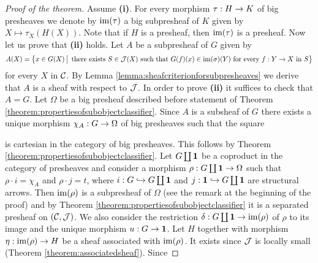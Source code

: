 \begin{proof}[Proof of the theorem]
Assume \textbf{(i)}. For every morphism $\tau:H\rightarrow K$ of big presheaves we denote by $\mathrm{im}(\tau)$ a big subpresheaf of $K$ given by $X\mapsto \tau_X\left(H(X)\right)$. Note that if $H$ is a presheaf, then $\mathrm{im}(\tau)$ is a presheaf. Now let us prove that \textbf{(ii)} holds. Let $A$ be a subpresheaf of $G$ given by
$$A(X) = \big\{x\in G(X)\,\big|\,\mbox{ there exists }S\in {\mathcal J}(X)\mbox{ such that }G(f)(x)\in \mathrm{im}(\sigma)(Y)\mbox{ for every }f:Y\rightarrow X\mbox{ in } S\big\}$$
for every $X$ in ${\mathcal C}$. By Lemma \ref{lemma:sheafcriterionforsubpresheaves} we derive that $A$ is a sheaf with respect to ${\mathcal J}$. In order to prove \textbf{(ii)} it suffices to check that $A = G$. Let $\Omega$ be a big presheaf described before statement of Theorem \ref{theorem:propertiesofsubobjectclassifier}. Since $A$ is a subsheaf of $G$ there exists a unique morphism $\chi_A:G\rightarrow \Omega$ of big presheaves such that the square
\begin{center}
\end{center}
is cartesian in the category of big presheaves. This follows by Theorem \ref{theorem:propertiesofsubobjectclassifier}. Let $G\coprod \mathbf{1}$ be a coproduct in the category of presheaves and consider a morphism $\rho:G\coprod \mathbf{1}\rightarrow \Omega$ such that $\rho\cdot i = \chi_A$ and $\rho\cdot j = t$, where $i:G\hookrightarrow G\coprod \mathbf{1}$ and $j:\mathbf{1}\hookrightarrow G\coprod \mathbf{1}$ are structural arrows. Then $\mathrm{im}(\rho)$ is a subpresheaf of $\Omega$ (see the remark at the beginning of the proof) and by Theorem \ref{theorem:propertiesofsubobjectclassifier} it is a separated presheaf on $({\mathcal C},{\mathcal J})$. We also consider the restriction $\delta:G\coprod \mathbf{1}\rightarrow \mathrm{im}(\rho)$ of $\rho$ to its image and the unique morphism $u:G\rightarrow \mathbf{1}$. Let $H$ together with morphism $\eta:\mathrm{im}(\rho)\rightarrow H$ be a sheaf associated with $\mathrm{im}(\rho)$. It exists since ${\mathcal J}$ is locally small (Theorem \ref{theorem:associatedsheaf}). Since

\end{proof}
